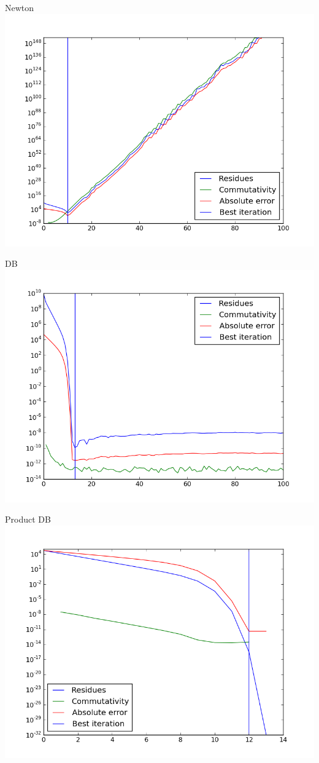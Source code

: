 \documentclass{beamer}
\theoremstyle{plain}
\theoremstyle{definition}
\theoremstyle{remark}
\begin{document}
\begin{frame}{Newton}
  \includegraphics[width=\textwidth,height=\textheight]{"e1/Newton - absplot"}
\end{frame}
\begin{frame}{DB}
  \includegraphics[width=\textwidth,height=\textheight]{"e1/DB - absplot"}
\end{frame}
\begin{frame}{Product DB}
  \includegraphics[width=\textwidth,height=\textheight]{"e1/Product DB - absplot"}
\end{frame}
\end{document}
